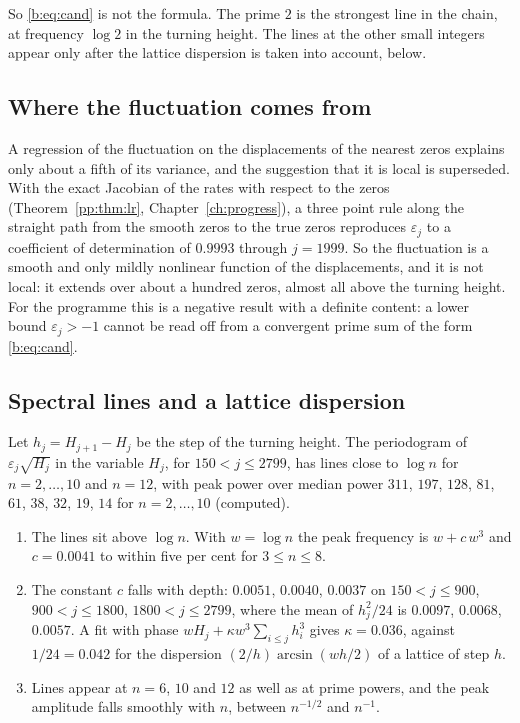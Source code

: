 So \eqref{b:eq:cand} is not the formula. The prime $2$ is the strongest line in the chain, at frequency $\log2$ in the turning height. The lines at the other small integers appear only after the lattice dispersion is taken into account, below.

\subsection{Where the fluctuation comes from}

A regression of the fluctuation on the displacements of the nearest zeros explains only about a fifth of its variance, and the suggestion that it is local is superseded. With the exact Jacobian of the rates with respect to the zeros (Theorem~\ref{pp:thm:lr}, Chapter~\ref{ch:progress}), a three point rule along the straight path from the smooth zeros to the true zeros reproduces $\varepsilon_j$ to a coefficient of determination of $0.9993$ through $j=1999$. So the fluctuation is a smooth and only mildly nonlinear function of the displacements, and it is not local: it extends over about a hundred zeros, almost all above the turning height. For the programme this is a negative result with a definite content: a lower bound $\varepsilon_j>-1$ cannot be read off from a convergent prime sum of the form \eqref{b:eq:cand}.

\subsection{Spectral lines and a lattice dispersion}

\begin{remark}\label{b:comp:lines}
Let $h_j=H_{j+1}-H_j$ be the step of the turning height. The periodogram of $\varepsilon_j\sqrt{H_j}$ in the variable $H_j$, for $150<j\le 2799$, has lines close to $\log n$ for $n=2,\dots,10$ and $n=12$, with peak power over median power $311$, $197$, $128$, $81$, $61$, $38$, $32$, $19$, $14$ for $n=2,\dots,10$ (computed).
\begin{enumerate}
\item The lines sit above $\log n$. With $w=\log n$ the peak frequency is $w+c\,w^{3}$ and $c=0.0041$ to within five per cent for $3\le n\le 8$.
\item The constant $c$ falls with depth: $0.0051$, $0.0040$, $0.0037$ on $150<j\le900$, $900<j\le1800$, $1800<j\le2799$, where the mean of $h_j^{2}/24$ is $0.0097$, $0.0068$, $0.0057$. A fit with phase $wH_j+\kappa w^{3}\sum_{i\le j}h_i^{3}$ gives $\kappa=0.036$, against $1/24=0.042$ for the dispersion $(2/h)\arcsin(wh/2)$ of a lattice of step $h$.
\item Lines appear at $n=6$, $10$ and $12$ as well as at prime powers, and the peak amplitude falls smoothly with $n$, between $n^{-1/2}$ and $n^{-1}$.
\end{enumerate}
\end{remark}

